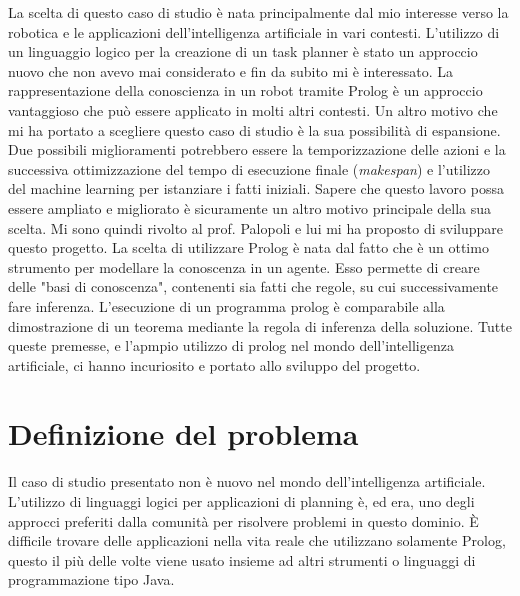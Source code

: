 La scelta di questo caso di studio è nata principalmente dal mio interesse verso la robotica e le applicazioni dell'intelligenza artificiale in vari contesti.
L'utilizzo di un linguaggio logico per la creazione di un task planner è stato un approccio nuovo che non avevo mai considerato e fin da subito mi è interessato. 
La rappresentazione della conoscienza in un robot tramite Prolog è un approccio vantaggioso che può essere applicato in molti altri contesti.
Un altro motivo che mi ha portato a scegliere questo caso di studio è la sua possibilità di espansione. Due possibili miglioramenti potrebbero essere
la temporizzazione delle azioni e la successiva ottimizzazione del tempo
di esecuzione finale (\textit{makespan}) e l'utilizzo del machine learning per istanziare i fatti iniziali.
Sapere che questo lavoro possa essere ampliato e migliorato è sicuramente un altro motivo principale della sua scelta.
Mi sono quindi rivolto al prof. Palopoli e lui mi ha proposto di sviluppare questo progetto.
La scelta di utilizzare Prolog è nata dal fatto che è un ottimo strumento per modellare la conoscenza in un agente.
Esso permette di creare delle "basi di conoscenza", contenenti sia fatti che regole, su cui successivamente fare inferenza.
L'esecuzione di un programma prolog è comparabile alla dimostrazione di un teorema mediante la regola di inferenza della soluzione.
Tutte queste premesse, e l'apmpio utilizzo di prolog nel mondo dell'intelligenza artificiale, ci hanno incuriosito e portato allo sviluppo del progetto.

\section{Definizione del problema}
\label{sec:defprob}
Il caso di studio presentato non è nuovo nel mondo dell'intelligenza artificiale. L'utilizzo di linguaggi logici per applicazioni di planning è, ed era, uno
degli approcci preferiti dalla comunità per risolvere problemi in questo dominio. È difficile trovare delle applicazioni nella vita reale che utilizzano solamente Prolog, questo il 
più delle volte viene usato insieme ad altri strumenti o linguaggi di programmazione tipo Java. 


